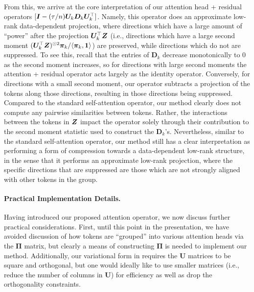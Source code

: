 \documentclass[\toplevelprefix/book-main.tex]{subfiles}
\begin{document}
From this, we arrive at the core interpretation of our attention head + residual operators $[\bm{I} - (\tau/n)\bm U_{k}\bm D_{k}\bm U_{k}^{\top}]$.  Namely, this operator does an approximate low-rank data-dependent projection, where directions which have a large amount of ``power'' after the projection $\bm U_k^\top \bm{Z}$ (i.e., directions which have a large second moment $(\bm U_{k}^{\top}\bm{Z})^{\odot 2}\bm \pi_k / \langle \bm \pi_{k}, \bm 1\rangle$) are preserved, while directions which do not are suppressed. To see this, recall that the entries of $\bm D_k$ decrease monotonically to 0 as the second moment increases, so for directions with large second moments the attention + residual operator acts largely as the identity operator.  Conversely, for directions with a small second moment, our operator subtracts a projection of the tokens along those directions, resulting in those directions being suppressed. Compared to the standard self-attention operator, our method clearly does not compute any pairwise similarities between tokens. Rather, the interactions between the tokens in $\bm{Z}$ impact the operator solely through their contribution to the second moment statistic used to construct the $\bm D_{k}$'s.  Nevertheless, similar to the standard self-attention operator, our method still has a clear interpretation as performing a form of compression towards a data-dependent low-rank structure, in the sense that it performs an approximate low-rank projection, where the specific directions that are suppressed are those which are not strongly aligned with other tokens in the group.

\paragraph{Practical Implementation Details.} Having introduced our proposed attention operator, we now discuss further practical considerations.  First, until this point in the presentation, we have avoided discussion of how tokens are ``grouped'' into various attention heads via the $\bm\Pi$ matrix, but clearly a means of constructing $\bm\Pi$ is needed to implement our method.  Additionally, our variational form in  requires the $\bm U$ matrices to be square and orthogonal, but one would ideally like to use smaller matrices (i.e., reduce the number of columns in $\bm U$) for efficiency as well as drop the orthogonality constraints. 
\end{document}
